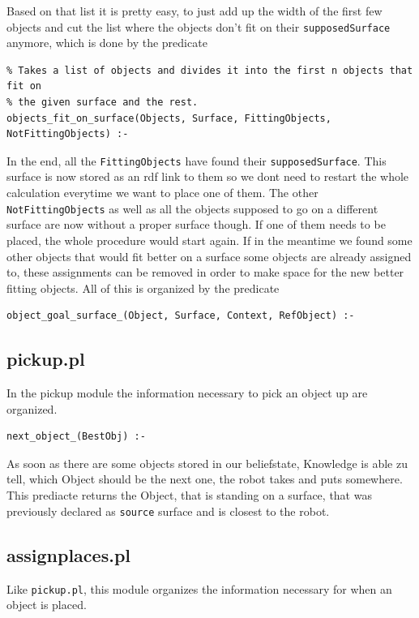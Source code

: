 \documentclass[main.tex]{subfiles}
\begin{document}
Based on that list it is pretty easy, to just add up the width of the first few objects and cut the list where the objects don't fit on their \texttt{supposedSurface} anymore, which is done by the predicate
\begin{lstlisting}
% Takes a list of objects and divides it into the first n objects that fit on
% the given surface and the rest.
objects_fit_on_surface(Objects, Surface, FittingObjects, NotFittingObjects) :-
\end{lstlisting}

In the end, all the \texttt{FittingObjects} have found their \texttt{supposedSurface}. This surface is now stored as an rdf link to them so we dont need to restart the whole calculation everytime we want to place one of them. The other \texttt{NotFittingObjects} as well as all the objects supposed to go on a different surface are now without a proper surface though. If one of them needs to be placed, the whole procedure would start again. If in the meantime we found some other objects that would fit better on a surface some objects are already assigned to, these assignments can be removed in order to make space for the new better fitting objects. All of this is organized by the predicate 
\begin{lstlisting}
object_goal_surface_(Object, Surface, Context, RefObject) :-
\end{lstlisting}

\subsection{pickup.pl}\label{sec:kn_pickup}

In the pickup module the information necessary to pick an object up are organized.

\begin{lstlisting}
next_object_(BestObj) :-
\end{lstlisting}
As soon as there are some objects stored in our beliefstate, Knowledge is able zu tell, which Object should be the next one, the robot takes and puts somewhere. This prediacte returns the Object, that is standing on a surface, that was previously declared as \texttt{source} surface and is closest to the robot.

\subsection{assignplaces.pl}

Like \texttt{pickup.pl}, this module organizes the information necessary for when an object is placed.\\
\end{document}
